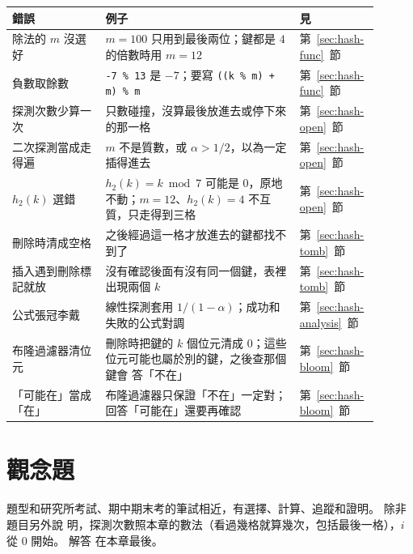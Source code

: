 \begin{center}
\small
\begin{tabular}{p{0.24\linewidth}p{0.50\linewidth}p{0.16\linewidth}}
\toprule
錯誤 & 例子 & 見 \\
\midrule
除法的 $m$ 沒選好 & $m = 100$ 只用到最後兩位；鍵都是 $4$ 的倍數時用 $m = 12$ &
第~\ref{sec:hash-func}~節 \\
負數取餘數 & \texttt{-7 \% 13} 是 $-7$；要寫 \texttt{((k \% m) + m) \% m} &
第~\ref{sec:hash-func}~節 \\
探測次數少算一次 & 只數碰撞，沒算最後放進去或停下來的那一格 &
第~\ref{sec:hash-open}~節 \\
二次探測當成走得遍 & $m$ 不是質數，或 $\alpha > 1/2$，以為一定插得進去 &
第~\ref{sec:hash-open}~節 \\
$h_2(k)$ 選錯 & $h_2(k) = k \bmod 7$ 可能是 $0$，原地不動；$m = 12$、$h_2(k) = 4$
不互質，只走得到三格 & 第~\ref{sec:hash-open}~節 \\
刪除時清成空格 & 之後經過這一格才放進去的鍵都找不到了 & 第~\ref{sec:hash-tomb}~節 \\
插入遇到刪除標記就放 & 沒有確認後面有沒有同一個鍵，表裡出現兩個 $k$ &
第~\ref{sec:hash-tomb}~節 \\
公式張冠李戴 & 線性探測套用 $1/(1-\alpha)$；成功和失敗的公式對調 &
第~\ref{sec:hash-analysis}~節 \\
布隆過濾器清位元 & 刪除時把鍵的 $k$ 個位元清成 $0$；這些位元可能也屬於別的鍵，之後查那個鍵會
答「不在」 & 第~\ref{sec:hash-bloom}~節 \\
「可能在」當成「在」 & 布隆過濾器只保證「不在」一定對；回答「可能在」還要再確認 &
第~\ref{sec:hash-bloom}~節 \\
\bottomrule
\end{tabular}
\end{center}

\section{觀念題}
\label{sec:hash-exercises}

題型和研究所考試、期中期末考的筆試相近，有選擇、計算、追蹤和證明。 除非題目另外說
明，探測次數照本章的數法（看過幾格就算幾次，包括最後一格），$i$ 從 $0$ 開始。 解答
在本章最後。


